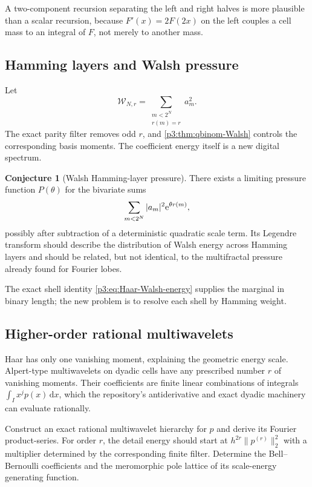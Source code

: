 \documentclass[11pt]{article}
\theoremstyle{definition}
\newtheorem{conjecture}[theorem]{Conjecture}
\theoremstyle{remark}
\newcommand{\dd}{\,\mathrm d}
\begin{document}
A two-component recursion separating the left and right halves is more
plausible than a scalar recursion, because $F'(x)=2F(2x)$ on the left couples a
cell mass to an integral of $F$, not merely to another mass.

\subsection{Hamming layers and Walsh pressure}

Let
\begin{equation}\label{p3:eq:Walsh-layer-energy}
 \mathcal W_{N,r}=\sum_{\substack{m<2^N\\r(m)=r}}a_m^2.
\end{equation}
The exact parity filter removes odd $r$, and
\cref{p3:thm:qbinom-Walsh} controls the corresponding basis moments.  The
coefficient energy itself is a new digital spectrum.

\begin{conjecture}[Walsh Hamming-layer pressure]
\label{p3:conj:Walsh-pressure}
There exists a limiting pressure function $P(\theta)$ for the bivariate sums
\begin{equation}\label{p3:eq:Walsh-pressure-sum}
 \sum_{m<2^N}|a_m|^2\mathrm e^{\theta r(m)},
\end{equation}
possibly after subtraction of a deterministic quadratic scale term.  Its
Legendre transform should describe the distribution of Walsh energy across
Hamming layers and should be related, but not identical, to the multifractal
pressure already found for Fourier lobes.
\end{conjecture}

The exact shell identity \eqref{p3:eq:Haar-Walsh-energy} supplies the marginal in
binary length; the new problem is to resolve each shell by Hamming weight.

\subsection{Higher-order rational multiwavelets}

Haar has only one vanishing moment, explaining the geometric energy scale.
Alpert-type multiwavelets on dyadic cells have any prescribed number $r$ of
vanishing moments.  Their coefficients are finite linear combinations of
integrals $\int_Ix^jp(x)\dd x$, which the repository's antiderivative and exact
dyadic machinery can evaluate rationally.

\begin{openproblem}
\label{p3:op:Alpert}
Construct an exact rational multiwavelet hierarchy for $p$ and derive its
Fourier product-series.  For order $r$, the detail energy should start at
$h^{2r}\|p^{(r)}\|_2^2$ with a multiplier determined by the corresponding
finite filter.  Determine the Bell--Bernoulli coefficients and the meromorphic
pole lattice of its scale-energy generating function.
\end{openproblem}
\end{document}

